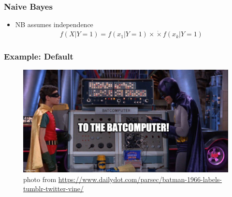 \documentclass[
  shownotes,
  xcolor={svgnames},
  hyperref={colorlinks,citecolor=DarkBlue,linkcolor=andesred,urlcolor=DarkBlue}
  , aspectratio=169]{beamer}
\begin{document}
\begin{frame}[fragile]
\frametitle{ Naive Bayes}
\begin{itemize}
  \item NB assumes independence
\begin{align}
  f(X|Y=1)=f(x_1|Y=1) \times \dot \times f(x_k|Y=1)
\end{align}
  
\end{itemize}
\end{frame}
\begin{frame}[fragile]
\frametitle{Example: Default}
\begin{figure}[H] \centering
  \centering
  \includegraphics[scale=0.35]{figures/baticomputer_meme.jpg}
  \\
  \tiny photo from \url{https://www.dailydot.com/parsec/batman-1966-labels-tumblr-twitter-vine/}
\end{figure}

 \end{frame}


\end{document}
